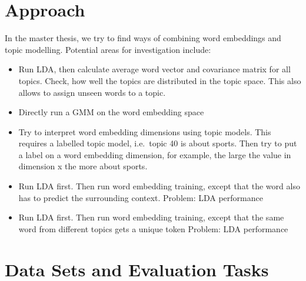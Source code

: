 \documentclass{sig-alternate-05-2015}
\begin{document}
\section{Approach}
\label{sec:approach}

In the master thesis, we try to find ways of combining word embeddings and topic modelling.
Potential areas for investigation include:
\begin{itemize}
       \item
              Run LDA, then calculate average word vector and covariance matrix for all topics.
              Check, how well the topics are distributed in the topic space.
              This also allows to assign unseen words to a topic.
       \item
              Directly run a GMM on the word embedding space
       \item
              Try to interpret word embedding dimensions using topic models.
              This requires a labelled topic model, i.e.\ topic 40 is about sports.
              Then try to put a label on a word embedding dimension, for example, the large the value in dimension x the more about sports.
       \item
              Run LDA first.
              Then run word embedding training, except that the word also has to predict the surrounding context.
              Problem: LDA performance
       \item
              Run LDA first.
              Then run word embedding training, except that the same word from different topics gets a unique token
              Problem: LDA performance
\end{itemize}




\section{Data Sets and Evaluation Tasks}
\label{sec:data-sets-and-evaluation}
\end{document}
